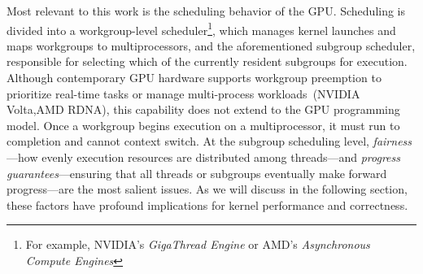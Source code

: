 \documentclass[sigconf]{acmart}
\begin{document}
Most relevant to this work is the scheduling behavior of the GPU\@. Scheduling is divided into a workgroup-level scheduler\footnote{For example, NVIDIA's \emph{GigaThread Engine} or AMD's \emph{Asynchronous Compute Engines}}, which manages kernel launches and maps workgroups to multiprocessors, and the aforementioned subgroup scheduler, responsible for selecting which of the currently resident subgroups for execution. Although contemporary GPU hardware supports workgroup preemption to prioritize real-time tasks or manage multi-process workloads~\cite{}(NVIDIA Volta,AMD RDNA), this capability does not extend to the GPU programming model. Once a workgroup begins execution on a multiprocessor, it must run to completion and cannot context switch. At the subgroup scheduling level, \emph{fairness}—how evenly execution resources are distributed among threads—and \emph{progress guarantees}—ensuring that all threads or subgroups eventually make forward progress—are the most salient issues. As we will discuss in the following section, these factors have profound implications for kernel performance and correctness.
\end{document}
